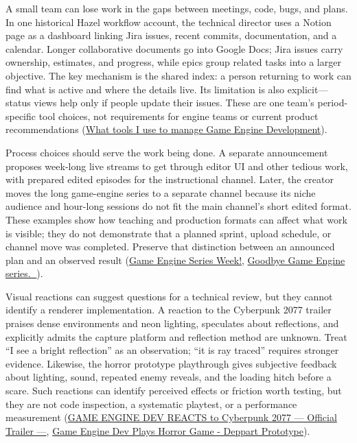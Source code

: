 A small team can lose work in the gaps between meetings, code, bugs, and plans. In one historical Hazel workflow account, the technical director uses a Notion page as a dashboard linking Jira issues, recent commits, documentation, and a calendar. Longer collaborative documents go into Google Docs; Jira issues carry ownership, estimates, and progress, while epics group related tasks into a larger objective. The key mechanism is the shared index: a person returning to work can find what is active and where the details live. Its limitation is also explicit---status views help only if people update their issues. These are one team's period-specific tool choices, not requirements for engine teams or current product recommendations (\href{https://www.youtube.com/watch?v=XGYEk9rbGjU&t=3m11s}{What tools I use to manage Game Engine Development}).

Process choices should serve the work being done. A separate announcement proposes week-long live streams to get through editor UI and other tedious work, with prepared edited episodes for the instructional channel. Later, the creator moves the long game-engine series to a separate channel because its niche audience and hour-long sessions do not fit the main channel's short edited format. These examples show how teaching and production formats can affect what work is visible; they do not demonstrate that a planned sprint, upload schedule, or channel move was completed. Preserve that distinction between an announced plan and an observed result (\href{https://www.youtube.com/watch?v=Q4wHOx5av0w&t=0m1s}{Game Engine Series Week!}, \href{https://www.youtube.com/watch?v=4w9NYltdaew&t=0m3s}{Goodbye Game Engine series. 👋}).

Visual reactions can suggest questions for a technical review, but they cannot identify a renderer implementation. A reaction to the Cyberpunk 2077 trailer praises dense environments and neon lighting, speculates about reflections, and explicitly admits the capture platform and reflection method are unknown. Treat ``I see a bright reflection'' as an observation; ``it is ray traced'' requires stronger evidence. Likewise, the horror prototype playthrough gives subjective feedback about lighting, sound, repeated enemy reveals, and the loading hitch before a scare. Such reactions can identify perceived effects or friction worth testing, but they are not code inspection, a systematic playtest, or a performance measurement (\href{https://www.youtube.com/watch?v=ZyfFCIFHYuk&t=1m11s}{GAME ENGINE DEV REACTS to Cyberpunk 2077 --- Official Trailer ---}, \href{https://www.youtube.com/watch?v=Y3-p6MlTjLA&t=0m0s}{Game Engine Dev Plays Horror Game - Deppart Prototype}).

